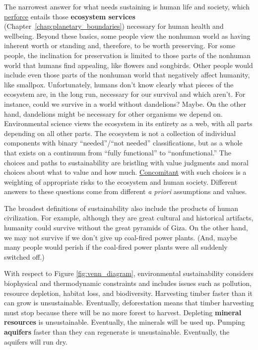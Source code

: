\documentclass{article}\usepackage[]{graphicx}\usepackage[table]{xcolor}
\begin{document}
The narrowest answer for what needs sustaining is human life and society, which
\href{https://www.merriam-webster.com/dictionary/perforce}{perforce}
entails those \textbf{ecosystem services}
(Chapter~\ref{chap:planetary_boundaries})
necessary for human health and wellbeing.
Beyond these basics, some people view the nonhuman world as having inherent 
worth or standing and, therefore, to be worth preserving.
For some people, the inclination for preservation is limited to those parts
of the nonhuman world that humans find appealing, like flowers and songbirds.
Other people would include even those parts of the nonhuman world that negatively
affect humanity, like smallpox.
Unfortunately, humans don’t know clearly what pieces of the ecosystem
are, in the long run, necessary for our survival and which aren’t.
For instance, could we survive in a world without dandelions?
Maybe.
On the other hand, dandelions might be necessary for other organisms we depend on.
Environmental science views the ecosystem in its entirety as a web, with all parts
depending on all other parts.
The ecosystem is not a collection of individual components with binary ``needed''/``not
needed'' classifications, but as a whole that exists on a continuum from ``fully functional''
to ``nonfunctional.''
The choices and paths to sustainability are bristling with value judgments and
moral choices about what to value and how much.
\href{https://en.wiktionary.org/wiki/concomitant}{Concomitant} with such choices
is a weighting of appropriate risks to the ecosystem and human society.
Different answers to these questions come from different \emph{a priori} assumptions and values.

The broadest definitions of sustainability
also include the products of human civilization.
For example, although they are great cultural and historical artifacts,
humanity could survive without the great pyramids of Giza.
On the other hand, we may not survive if we don’t give up coal-fired power plants.
(And, maybe many people would perish if the coal-fired power plants
were all suddenly switched off.)

With respect to Figure \ref{fig:venn_diagram}, environmental sustainability
considers biophysical and thermodynamic constraints and includes issues such as
pollution, resource depletion, habitat loss, and biodiversity.
Harvesting timber faster than it can grow is unsustainable.
Eventually, deforestation means that timber harvesting must stop because there
will be no more forest to harvest.
Depleting \textbf{mineral resources} is unsustainable.
Eventually, the minerals will be used up.
Pumping \textbf{aquifers} faster than they can regenerate is unsustainable.
Eventually, the aquifers will run dry.
\end{document}
